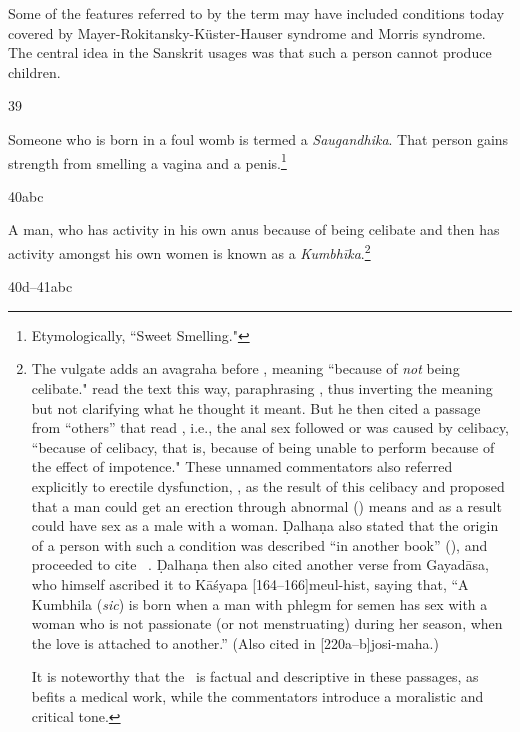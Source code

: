 \begin{translation}
{Some of the features referred to by the term  may
have included conditions today covered by
Mayer-Rokitansky-Küster-Hauser syndrome and Morris syndrome.  The
central idea in the Sanskrit usages was that such a person cannot
produce children.}

\item[39]

Someone who is born in a foul womb is termed a \emph{Saugandhika}. 
That person gains strength from smelling a vagina and a
penis.\footnote{Etymologically, “Sweet Smelling."}

\item[40abc]

A man, who has activity in his own anus because of being celibate and
then has activity amongst his own women is known as a
\emph{Kumbhīka}.\footnote{The vulgate adds an avagraha before
    , meaning “because of \emph{not} being celibate."
     read the text this way, paraphrasing
    , thus inverting the meaning but not clarifying
    what he thought it meant.  But he then cited a passage from “others”
    that read , i.e., the anal sex followed or was
    caused by celibacy,  “because of celibacy, that is,
    because of being unable to perform because of the effect of
    impotence."  These unnamed commentators also referred explicitly to
    erectile dysfunction, , as the result of
    this celibacy and proposed that a man could get an erection through
    abnormal () means and as a result could have sex as a
    male with a woman.  Ḍalhaṇa also stated that the origin of a person
    with such a condition was described “in another book”
    (), and proceeded to cite \CS\ .  
    Ḍalhaṇa then also cited another verse from Gayadāsa, who himself 
    ascribed it to Kāśyapa [164--166]{meul-hist}, saying that, “A 
    Kumbhila (\emph{sic}) is born when a man with phlegm for semen 
    has sex with a woman who is not passionate (or not menstruating) during 
    her season, when the love is attached to another.” (Also cited in 
    [220a--b]{josi-maha}.)
    
    It is noteworthy that the \SS\ is factual and descriptive in
these passages, as befits a medical work, while the commentators
introduce a moralistic and critical tone.}

\item[40d--41abc]


\end{translation}
